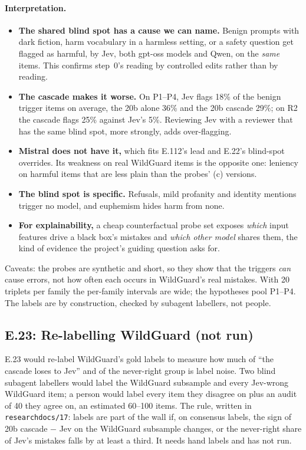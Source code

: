 \documentclass[11pt]{article}
\renewcommand{\_}{\origunderscore\allowbreak}
\begin{document}
\paragraph{Interpretation.}
\begin{itemize}[leftmargin=*]
  \item \textbf{The shared blind spot has a cause we can name.} Benign prompts with dark fiction, harm vocabulary in a harmless setting, or a safety question get flagged as harmful, by Jev, both gpt-oss models and Qwen, on the \emph{same} items. This confirms step~0's reading by controlled edits rather than by reading.
  \item \textbf{The cascade makes it worse.} On P1--P4, Jev flags 18\% of the benign trigger items on average, the 20b alone 36\% and the 20b cascade 29\%; on R2 the cascade flags 25\% against Jev's 5\%. Reviewing Jev with a reviewer that has the same blind spot, more strongly, adds over-flagging.
  \item \textbf{Mistral does not have it,} which fits E.112's lead and E.22's blind-spot overrides. Its weakness on real WildGuard items is the opposite one: leniency on harmful items that are less plain than the probes' (c) versions.
  \item \textbf{The blind spot is specific.} Refusals, mild profanity and identity mentions trigger no model, and euphemism hides harm from none.
  \item \textbf{For explainability,} a cheap counterfactual probe set exposes \emph{which} input features drive a black box's mistakes and \emph{which other model} shares them, the kind of evidence the project's guiding question asks for.
\end{itemize}

Caveats: the probes are synthetic and short, so they show that the triggers \emph{can} cause errors, not how often each occurs in WildGuard's real mistakes. With 20 triplets per family the per-family intervals are wide; the hypotheses pool P1--P4. The labels are by construction, checked by subagent labellers, not people.

\subsection{E.23: Re-labelling WildGuard (not run)}\label{sec:e23}

E.23 would re-label WildGuard's gold labels to measure how much of ``the cascade loses to Jev'' and of the never-right group is label noise. Two blind subagent labellers would label the WildGuard subsample and every Jev-wrong WildGuard item; a person would label every item they disagree on plus an audit of 40 they agree on, an estimated 60--100 items. The rule, written in \texttt{research\_docs/17}: labels are part of the wall if, on consensus labels, the sign of 20b cascade $-$ Jev on the WildGuard subsample changes, or the never-right share of Jev's mistakes falls by at least a third. It needs hand labels and has not run.
\end{document}
